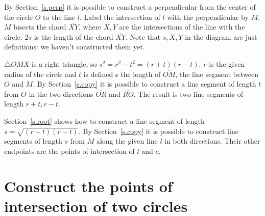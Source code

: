 By Section~\ref{s.perp} it is possible to construct a perpendicular from the center of the circle $O$ to the line $l$. Label the intersection of $l$ with the perpendicular by $M$. $M$ bisects the chord $\overline{XY}$, where $X, Y$ are the intersections of the line with the circle. $2s$ is the length of the chord $\overline{XY}$. Note that $s,X,Y$ in the diagram are just definitions: we haven't constructed them yet.

\begin{center}
\end{center}
$\triangle OMX$ is a right triangle, so $s^2=r^2-t^2=(r+t)(r-t)$. $r$ is the given radius of the circle and $t$ is defined s the length of $\overline{OM}$, the line segment between $O$ and $M$. By Section~\ref{s.copy} it is possible to construct a line segment of length $t$ from $O$ in the two directions $\overline{OR}$ and $\overline{RO}$. The result is two line segments of length $r+t,r-t$.

Section~\ref{s.root} shows how to construct a line segment of length $s=\sqrt{(r+t)(r-t)}$. By Section~\ref{s.copy} it is possible to construct line segments of length $s$ from $M$ along the given line $l$ in both directions. Their other endpoints are the points of intersection of $l$ and $c$.


\section{Construct the points of intersection of two circles}\label{s.two-circles}

